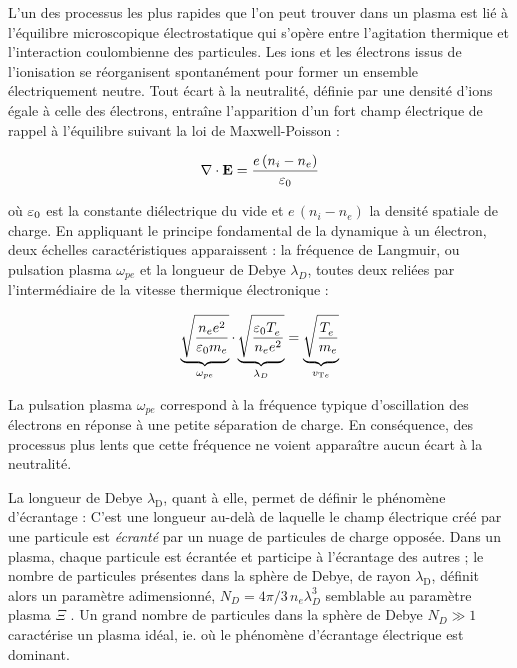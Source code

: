 \begin{refsection}
L'un des processus les plus rapides que l'on peut trouver dans un plasma est lié à
l'équilibre microscopique électrostatique qui s'opère
entre l'agitation thermique et l'interaction coulombienne des particules. Les
ions et les électrons issus de l'ionisation se réorganisent spontanément pour former un ensemble électriquement neutre.
Tout écart à la neutralité, définie par une densité d'ions égale à celle des
électrons, entraîne l'apparition d'un fort champ électrique de rappel à
l'équilibre suivant la loi de Maxwell-Poisson :

\begin{align}
\label{1-Max-Poisson}
\nabla\cdot\mathbf{E}=\frac{e\,(n_{i}-n_{e})}{\varepsilon{_{0}}}
\end{align}

où $\varepsilon{_{0}}$ est la constante diélectrique du
vide et $e\,(n_{i}-n_{e})$ la densité spatiale de charge. 
En appliquant le principe fondamental de la dynamique à un électron, deux
échelles caractéristiques apparaissent : la fréquence de Langmuir, ou pulsation
plasma $\omega_{pe}$ et la longueur de Debye $\lambda_D$, toutes deux reliées
par l'intermédiaire de la vitesse thermique électronique :

\begin{equation}
\underbrace{\sqrt{\frac{n_e
e^{{2}}}{\varepsilon{_{0}}
m_{e}}}}_{\omega_{pe}}\cdot\underbrace{\sqrt{\frac{\varepsilon{_{0}}
T_{e}^{{\phantom{1}}}}{n_e e^{{2}}}}}_{\lambda_D}
=\underbrace{\sqrt{\frac{T_{e}^{{\phantom{1}}}}{m_{e}}}}_{v_{\text{T}{e}}}
\end{equation}

La pulsation plasma $\omega_{pe}$ correspond à la fréquence typique
d'oscillation des électrons en réponse à une petite séparation de charge. En
conséquence, des processus plus lents que cette fréquence ne voient
apparaître aucun écart à la neutralité.

La longueur de Debye $\lambda_\text{D}$, quant à elle, permet de définir le
phénomène d'écrantage :
C'est une longueur au-delà de laquelle le champ électrique créé par une particule est \emph{écranté} par 
un nuage de particules de charge opposée. Dans un plasma, chaque particule est
écrantée et participe à l'écrantage des autres ; le nombre de particules présentes
dans la sphère de Debye, de rayon $\lambda_\text{D}$, définit alors un paramètre
adimensionné, $N_D=4\pi/3\,n_e\lambda_D^3$ semblable au paramètre plasma $\Xi$
. Un grand nombre de particules dans la sphère de Debye
$N_D\gg1$ caractérise un plasma idéal, ie. où le
phénomène d'écrantage électrique est dominant.


\end{refsection}
